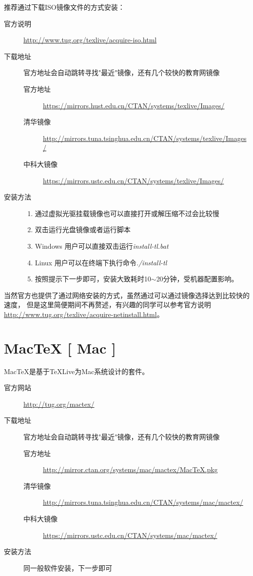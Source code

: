 推荐通过下载ISO镜像文件的方式安装：
\begin{description}
	\item[官方说明]
	\url{http://www.tug.org/texlive/acquire-iso.html}
	\item[下载地址] 官方地址会自动跳转寻找"最近"镜像，还有几个较快的教育网镜像
	\begin{description}
		\item[官方地址]
		\url{https://mirrors.hust.edu.cn/CTAN/systems/texlive/Images/}
		\item[清华镜像]
		\url{http://mirrors.tuna.tsinghua.edu.cn/CTAN/systems/texlive/Images/}
		\item[中科大镜像]
		\url{https://mirrors.ustc.edu.cn/CTAN/systems/texlive/Images/}
	\end{description}
	\item[安装方法] \hfill
	\begin{enumerate}
		\item 通过虚拟光驱挂载镜像也可以直接打开或解压缩不过会比较慢
		\item 双击运行光盘镜像或者运行脚本
		\item[] Windows 用户可以直接双击运行\textsl{install-tl.bat}
		\item[] Linux 用户可以在终端下执行命令\textsl{./install-tl}
		\item 按照提示下一步即可，安装大致耗时10$\sim$20分钟，受机器配置影响。
	\end{enumerate}
\end{description}

当然官方也提供了通过网络安装的方式，虽然通过可以通过镜像选择达到比较快的速度，
但是这里简便期间不再赘述，有兴趣的同学可以参考官方说明
\url{http://www.tug.org/texlive/acquire-netinstall.html}。

\section{Mac\TeX{} [ Mac ]}

Mac\TeX{}是基于\TeX{}Live为Mac系统设计的套件。

\begin{description}
	\item[官方网站]
	\url{http://tug.org/mactex/}
	\item[下载地址] 官方地址会自动跳转寻找"最近"镜像，还有几个较快的教育网镜像
	\begin{description}
		\item[官方地址]
		\url{http://mirror.ctan.org/systems/mac/mactex/MacTeX.pkg}
		\item[清华镜像]
		\url{http://mirrors.tuna.tsinghua.edu.cn/CTAN/systems/mac/mactex/}
		\item[中科大镜像]
		\url{https://mirrors.ustc.edu.cn/CTAN/systems/mac/mactex/}
	\end{description}
	\item[安装方法] 同一般软件安装，下一步即可
\end{description}

